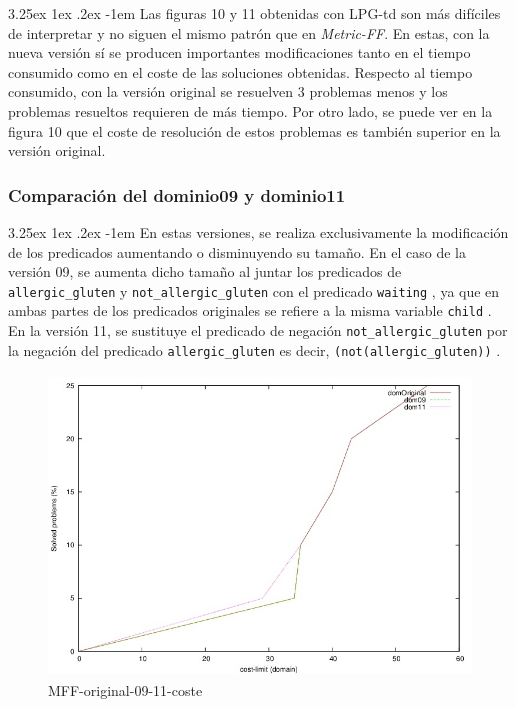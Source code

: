 \documentclass{article}
\makeatletter
\newcommand{\cool}[1] {
        {\texttt{#1}}
    }
\renewcommand\paragraph{\@startsection{paragraph}{5}{\z@}%
      {3.25ex \@plus1ex \@minus.2ex}%
      {-1em}%
      {\normalfont\normalsize\bfseries}}
\makeatother
\begin{document}
    \paragraph{}
    Las figuras 10 y 11 obtenidas con LPG-td son más difíciles de interpretar y no siguen el mismo patrón que en \textit{Metric-FF}. En estas, con la nueva versión sí se producen importantes modificaciones tanto en el tiempo consumido como en el coste de las soluciones obtenidas. Respecto al tiempo consumido, con la versión original se resuelven 3 problemas menos y los problemas resueltos requieren de más tiempo. Por otro lado, se puede ver en la figura 10 que el coste de resolución de estos problemas es también superior en la versión original.
    
    \subsubsection{Comparación del dominio09 y dominio11}
    \paragraph{}
    En estas versiones, se realiza exclusivamente la modificación de los predicados aumentando o disminuyendo su tamaño. En el caso de la versión 09, se aumenta dicho tamaño al juntar los predicados de \cool{allergic\_gluten} y \cool{not\_allergic\_gluten} con el predicado \cool{waiting}, ya que en ambas partes de los predicados originales se refiere a la misma variable \cool{child}. En la versión 11, se sustituye el predicado de negación \cool{not\_allergic\_gluten} por la negación del predicado \cool{allergic\_gluten} es decir, \cool{(not(allergic\_gluten))}.
    
    \begin{figure}[H]
        \centering
        \includegraphics[width=12cm, height=8cm]{mff-or-09-11-cost}
        \caption{MFF-original-09-11-coste}
    \end{figure}
    
\end{document}
